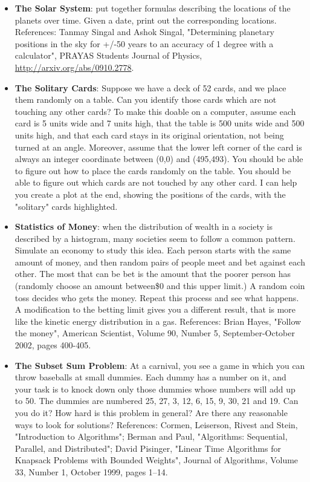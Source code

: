 \documentclass{article}
\begin{document}
\begin{itemize}
\item \textbf{The Solar System}: put together formulas describing the locations of the planets over time. Given a date, print out the corresponding locations. References: Tanmay Singal and Ashok Singal, "Determining planetary positions in the sky for +/-50 years to an accuracy of 1 degree with a calculator", PRAYAS Students Journal of Physics, \url{http://arxiv.org/abs/0910.2778}.

\item \textbf{The Solitary Cards}: Suppose we have a deck of 52 cards, and we place them randomly on a table. Can you identify those cards which are not touching any other cards? To make this doable on a computer, assume each card is 5 units wide and 7 units high, that the table is 500 units wide and 500 units high, and that each card stays in its original orientation, not being turned at an angle. Moreover, assume that the lower left corner of the card is always an integer coordinate between (0,0) and (495,493). You should be able to figure out how to place the cards randomly on the table. You should be able to figure out which cards are not touched by any other card. I can help you create a plot at the end, showing the positions of the cards, with the "solitary" cards highlighted.

\item \textbf{Statistics of Money}: when the distribution of wealth in a society is described by a histogram, many societies seem to follow a common pattern. Simulate an economy to study this idea. Each person starts with the same amount of money, and then random pairs of people meet and bet against each other. The most that can be bet is the amount that the poorer person has (randomly choose an amount between\$0 and this upper limit.) A random coin toss decides who gets the money. Repeat this process and see what happens. A modification to the betting limit gives you a different result, that is more like the kinetic energy distribution in a gas. References: Brian Hayes, "Follow the money", American Scientist, Volume 90, Number 5, September-October 2002, pages 400-405.

\item \textbf{The Subset Sum Problem}: At a carnival, you see a game in which you can throw baseballs at small dummies. Each dummy has a number on it, and your task is to knock down only those dummies whose numbers will add up to 50. The dummies are numbered 25, 27, 3, 12, 6, 15, 9, 30, 21 and 19. Can you do it? How hard is this problem in general? Are there any reasonable ways to look for solutions? References: Cormen, Leiserson, Rivest and Stein, "Introduction to Algorithms"; Berman and Paul, "Algorithms: Sequential, Parallel, and Distributed"; David Pisinger, "Linear Time Algorithms for Knapsack Problems with Bounded Weights", Journal of Algorithms, Volume 33, Number 1, October 1999, pages 1–14.


\end{itemize}
\end{document}
